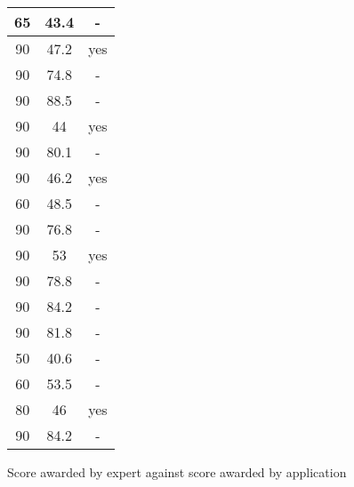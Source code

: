 \begin{figure}[H]
\begin{tabular}{ | c | c | c | }
		65 & 43.4 & - \\ \hline
		90 & 47.2 & yes \\ \hline
		90 & 74.8 & - \\ \hline
		90 & 88.5 & - \\ \hline
		90 & 44 & yes \\ \hline
		90 & 80.1 & - \\ \hline
		90 & 46.2 & yes \\ \hline
		60 & 48.5 & - \\ \hline
		90 & 76.8 & - \\ \hline
		90 & 53 & yes \\ \hline
		90 & 78.8 & - \\ \hline
		90 & 84.2 & - \\ \hline
		90 & 81.8 & - \\ \hline
		50 & 40.6 & - \\ \hline
		60 & 53.5 & - \\ \hline
		80 & 46 & yes \\ \hline
		90 & 84.2 & - \\ \hline
    \end{tabular}
\caption{Score awarded by expert against score awarded by application}
\label{fig:analysisevalscores}
\end{figure}

